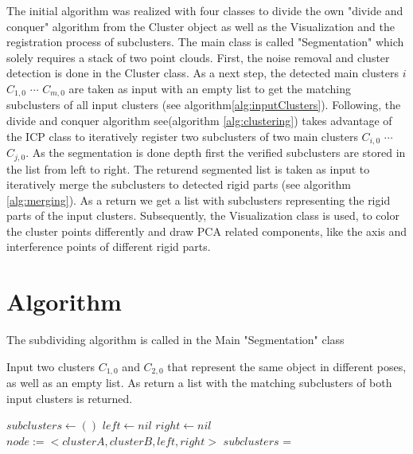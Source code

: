 The initial algorithm was realized with four classes to divide the  own "divide and conquer" algorithm from the Cluster object as well as the Visualization and the registration process of subclusters.
The main class is called "Segmentation" which solely requires a stack of two point clouds. First, the noise removal and cluster detection is done in the Cluster class. As a next step, the detected main clusters $i$ $C_{1,0}$ $\cdots$ $C_{m,0}$ are taken as input with an empty list to get the matching subclusters of all input clusters (see algorithm\ref{alg:inputClusters}). Following, the divide and conquer algorithm see(algorithm \ref{alg:clustering}) takes advantage of the ICP class to iteratively register two subclusters of two main clusters $C_{i,0}$ $\cdots$ $C_{j,0}$. As the segmentation is done depth first the verified subclusters are stored in the list from left to right. The returend segmented list is taken as input to iteratively merge the subclusters to detected rigid parts (see algorithm \ref{alg:merging}). As a return we get a list with subclusters representing the rigid parts of the input clusters. Subsequently, the Visualization class is used, to color the cluster points differently and draw PCA related components, like the axis and interference points of different rigid parts.


\section{Algorithm}

The subdividing algorithm is called in the Main "Segmentation" class

\begin{algorithm}[tbp]
	\caption{Input two clusters $C_{1,0}$ and $C_{2,0}$ that represent the same object in different poses, as well as an empty list. As return a list with the matching subclusters of both input clusters is returned.}
	\label{alg:inputClusters}
	\begin{algorithmic}[1]     %
		\label{inputClusters}
		
		\State $subclusters \gets ()$
		\State $left \gets nil$
		\State $right \gets nil$
		\State $node:=<clusterA, clusterB, left, right>$
		\State $subclusters$ = 

		\EndProcedure
	\end{algorithmic}
\end{algorithm}


